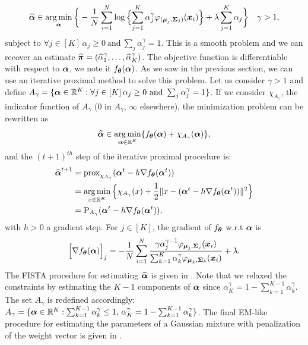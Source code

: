 \begin{equation}
\widehat{\boldsymbol \alpha}\in\operatorname*{arg\,min}_{\boldsymbol \alpha}\bigg\{
-\frac{1}{N}\sum_{i=1}^{N}\log\Big\{{\sum_{j=1}^K\alpha^\gamma_j\varphi_{(\boldsymbol\mu_{j},\boldsymbol\Sigma_{j})}(\boldsymbol x_i)}\Big\}+\lambda\sum_{j=1}^{K}\alpha_j \color{black} \bigg\}\quad \gamma > 1,  
\end{equation}
subject to  $\forall j \in[K]\, \alpha_j \geq0\ \text{and}\ \sum_{j}\alpha^\gamma_{j}=1$. This is a smooth problem and we can recover an estimate $\widehat{\boldsymbol \pi}=(\widehat\alpha_1^{\gamma},\dots,\widehat\alpha_K^{\gamma})$. The objective function is differentiable with respect to $\boldsymbol \alpha$, we note it $f_{\boldsymbol\theta}(\boldsymbol \alpha)$. As we saw in the previous section, we can use an iterative proximal method to solve this problem. Let us consider $\gamma > 1$ and define $A_{\gamma}=\{\balpha\in\RR^K: \forall j \in[K]\, \alpha_j\geq0\ \text{and}\ \sum_{j}\alpha^\gamma_{j}=1 \}$. If we consider {\large$\chi_{A_{\gamma}}$}, the indicator function of $A_{\gamma}$ ($0$ in $A_{\gamma}$, $\infty$ elsewhere), the minimization problem can be rewritten as
\begin{equation}
  \widehat{\boldsymbol \alpha}\in\operatorname*{arg\,min}_{\boldsymbol \alpha\in{\mathbb R}^{K}}\{ f_{\boldsymbol\theta}(\boldsymbol \alpha) + \chi_{A_{\gamma}}(\boldsymbol \alpha)\},
\end{equation}
and the $(t+1)^{th}$ step of the iterative proximal procedure is:
\begin{align}
\widehat{\boldsymbol \alpha}^{t+1}
&={\text{prox}}_{\chi_{A_{\gamma}}}( \boldsymbol \alpha^t - h \nabla f_{{\boldsymbol\theta}}(\boldsymbol \alpha^t)  )\\
&=\operatorname*{arg\,min}_{x\in{\mathbb R}^{K}}\Big\{ \chi_{A_{\gamma}}(x) + \frac{1}{2}\|x-(\boldsymbol \alpha^t - h \nabla f_{{\boldsymbol\theta}}(\boldsymbol \alpha^t)) \|^2 \Big\}\\
&=\textnormal{P}_{A_{\gamma}}(\boldsymbol \alpha^t - h \nabla f_{{\boldsymbol\theta}}(\boldsymbol \alpha^t) ),
\end{align}
with $h>0$ a gradient step. For $j\in[K]$, the gradient of $f_{{\boldsymbol\theta}}$ w.r.t $\boldsymbol \alpha$ is
\begin{equation}
  \Big[\nabla f_{{\boldsymbol\theta}}(\boldsymbol \alpha)\Big]_{j} = -\frac{1}{N}\sum_{i=1}^N\frac{\gamma\alpha_j^{\gamma-1}\varphi_{\boldsymbol\mu_j,\boldsymbol\Sigma_j}(\boldsymbol x_i)}{\sum_{k=1}^K\alpha_k^{\gamma}\varphi_{\boldsymbol\mu_k,\boldsymbol\Sigma_k}(\boldsymbol x_i)}+\lambda.
\end{equation}
The FISTA procedure for estimating $\widehat{\boldsymbol \alpha}$ is given in . Note that we relaxed the constraints by estimating the $K-1$ components of $\boldsymbol \alpha$ since $\alpha_K^{\gamma}=1-\sum_{k=1}^{K-1}\alpha_k^{\gamma}$. The set $A_{\gamma}$ is redefined accordingly: $A_{\gamma}=\{\boldsymbol \alpha\in{\mathbb R}^{K}: \sum_{k=1}^{K-1}\alpha_k^{\gamma}\leq1,\, \alpha_K^{\gamma}=1-\sum_{k=1}^{K-1}\alpha_k^{\gamma}\}$. The final EM-like procedure for estimating the parameters of a Gaussian mixture with penalization of the weight vector is given in .
